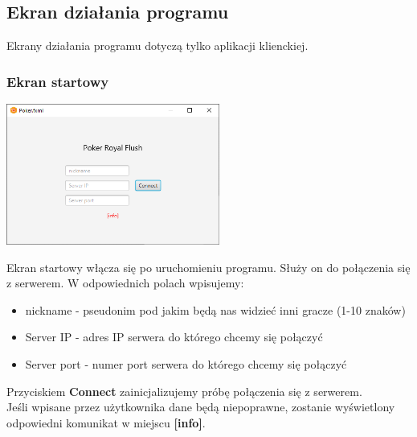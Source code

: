 \documentclass{article}
\begin{document}
    \subsection{Ekran działania programu}
        Ekrany działania programu dotyczą tylko aplikacji klienckiej.
        \subsubsection{Ekran startowy}
            \begin{center}
                \includegraphics[width=70mm]{gui_start.png}
            \end{center}
            Ekran startowy włącza się po uruchomieniu programu. Służy on do połączenia się z serwerem.
            W odpowiednich polach wpisujemy:
            \begin{itemize}
                \item nickname - pseudonim pod jakim będą nas widzieć inni gracze (1-10 znaków)
                \item Server IP - adres IP serwera do którego chcemy się połączyć
                \item Server port - numer port serwera do którego chcemy się połączyć
            \end{itemize}
            Przyciskiem \textbf{Connect} zainicjalizujemy próbę połączenia się z serwerem.\\
            Jeśli wpisane przez użytkownika dane będą niepoprawne, zostanie wyświetlony odpowiedni komunikat w miejscu \textbf{[info]}.
            
\end{document}
